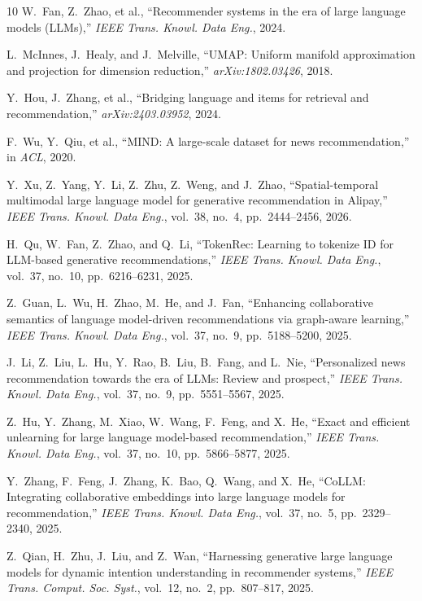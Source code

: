 \documentclass[lettersize,journal]{IEEEtran}
\begin{document}
\begin{thebibliography}{10}
W.~Fan, Z.~Zhao, et al., ``Recommender systems in the era of large language models (LLMs),'' \emph{IEEE Trans. Knowl. Data Eng.}, 2024.

L.~McInnes, J.~Healy, and J.~Melville, ``UMAP: Uniform manifold approximation and projection for dimension reduction,'' \emph{arXiv:1802.03426}, 2018.

Y.~Hou, J.~Zhang, et al., ``Bridging language and items for retrieval and recommendation,'' \emph{arXiv:2403.03952}, 2024.

F.~Wu, Y.~Qiu, et al., ``MIND: A large-scale dataset for news recommendation,'' in \emph{ACL}, 2020.

Y.~Xu, Z.~Yang, Y.~Li, Z.~Zhu, Z.~Weng, and J.~Zhao, ``Spatial-temporal multimodal large language model for generative recommendation in Alipay,'' \emph{IEEE Trans. Knowl. Data Eng.}, vol.~38, no.~4, pp.~2444--2456, 2026.

H.~Qu, W.~Fan, Z.~Zhao, and Q.~Li, ``TokenRec: Learning to tokenize ID for LLM-based generative recommendations,'' \emph{IEEE Trans. Knowl. Data Eng.}, vol.~37, no.~10, pp.~6216--6231, 2025.

Z.~Guan, L.~Wu, H.~Zhao, M.~He, and J.~Fan, ``Enhancing collaborative semantics of language model-driven recommendations via graph-aware learning,'' \emph{IEEE Trans. Knowl. Data Eng.}, vol.~37, no.~9, pp.~5188--5200, 2025.

J.~Li, Z.~Liu, L.~Hu, Y.~Rao, B.~Liu, B.~Fang, and L.~Nie, ``Personalized news recommendation towards the era of LLMs: Review and prospect,'' \emph{IEEE Trans. Knowl. Data Eng.}, vol.~37, no.~9, pp.~5551--5567, 2025.

Z.~Hu, Y.~Zhang, M.~Xiao, W.~Wang, F.~Feng, and X.~He, ``Exact and efficient unlearning for large language model-based recommendation,'' \emph{IEEE Trans. Knowl. Data Eng.}, vol.~37, no.~10, pp.~5866--5877, 2025.

Y.~Zhang, F.~Feng, J.~Zhang, K.~Bao, Q.~Wang, and X.~He, ``CoLLM: Integrating collaborative embeddings into large language models for recommendation,'' \emph{IEEE Trans. Knowl. Data Eng.}, vol.~37, no.~5, pp.~2329--2340, 2025.

Z.~Qian, H.~Zhu, J.~Liu, and Z.~Wan, ``Harnessing generative large language models for dynamic intention understanding in recommender systems,'' \emph{IEEE Trans. Comput. Soc. Syst.}, vol.~12, no.~2, pp.~807--817, 2025.


\end{thebibliography}
\end{document}
